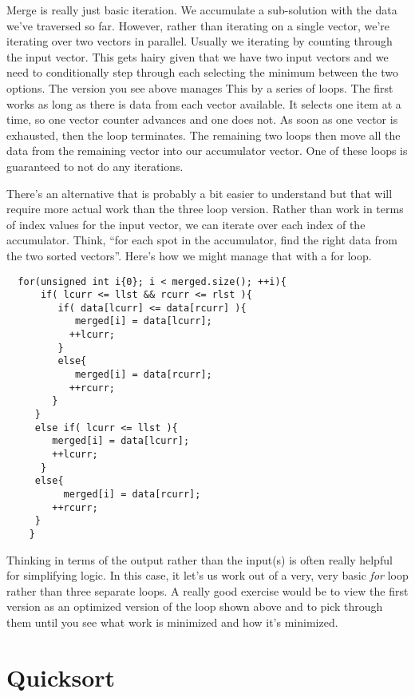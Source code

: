 \documentclass[]{tufte-handout}
\begin{document}
Merge is really just basic iteration. We accumulate a sub-solution with the data we've traversed so far. However, rather than iterating on a single vector, we're iterating over two vectors in parallel. Usually we iterating by counting through the input vector. This gets hairy given that we have two input vectors and we need to conditionally step through each selecting the minimum between the two options. The version you see above manages This by a series of loops. The first works as long as there is data from each vector available. It selects one item at a time, so one vector counter advances and one does not. As soon as one vector is exhausted, then the loop terminates. The remaining two loops then move all the data from the remaining vector into our accumulator vector. One of these loops is guaranteed to not do any iterations. 

There's an alternative that is probably a bit easier to understand but that will require more actual work than the three loop version.  Rather than work in terms of index values for the input vector, we can iterate over each index of the accumulator. Think, ``for each spot in the accumulator, find the right data from the two sorted vectors''. Here's how we might manage that with a for loop. 
\begin{verbatim}
  for(unsigned int i{0}; i < merged.size(); ++i){
      if( lcurr <= llst && rcurr <= rlst ){
	     if( data[lcurr] <= data[rcurr] ){
	        merged[i] = data[lcurr];
	       ++lcurr;
	     }
      	 else{
	        merged[i] = data[rcurr];
	       ++rcurr;
       	}
     }
     else if( lcurr <= llst ){
	    merged[i] = data[lcurr];
     	++lcurr;
      }
     else{
	      merged[i] = data[rcurr];
    	++rcurr;
     }
    }
\end{verbatim}
Thinking in terms of the output rather than the input(s) is often really helpful for simplifying logic. In this case, it let's us work out of a very, very basic \textit{for} loop rather than three separate loops. A really good exercise  would be to view the first version as an optimized version of the loop shown above and to pick through them until you see what work is minimized and how it's minimized.

\section{Quicksort}
\end{document}
